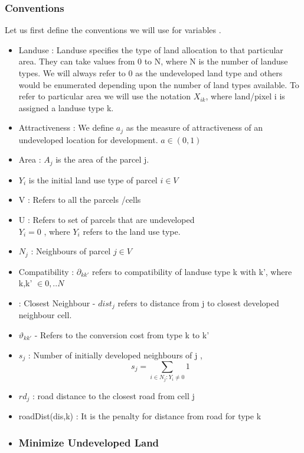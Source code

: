\documentclass[twoside,10pt]{article}
\begin{document}
\subsubsection*{Conventions}
Let us first define the conventions we will use for variables . \\ 
\begin{itemize}
\item Landuse : Landuse specifies the type of land allocation to that particular area. They can take values from 0 to N, where N is the number of landuse types. We will always refer to 0 as the undeveloped land type and others would be enumerated depending upon the number of land types available. To refer to particular area we will use the notation $X_{ik}$, where land/pixel i is assigned a landuse type k.
\item Attractiveness : We define $a_j$  as the measure of attractiveness of an undeveloped location for development. 
$ a \in (0,1)$
\item Area : $A_j$ is the area of the parcel j.
\item $Y_i$ is the initial land use type of parcel $i \in V$
\item V : Refers to all the parcels /cells

\item U : Refers to set of parcels that are undeveloped \\
 
$ Y_{i} = 0$ , where  $Y_{i}$ refers to the land use type. 
\item $N_j$ : Neighbours of parcel $j \in V$    
\item Compatibility : $\partial_{kk'}$ refers to compatibility of landuse type k with k', where k,k' $\in {0,..N}$
\item : Closest Neighbour -  $dist_j$ refers to distance from j to closest developed neighbour cell.
\item $\vartheta_{kk'} $ - Refers to the conversion cost from  type k to k'
\item $s_j$ : Number of initially developed neighbours of j , $$ s_j = \sum_{i \in N_j: Y_i \neq 0} 1$$
\item $rd_j$ : road distance to the closest road from cell  j
\item roadDist(dis,k) : It is the penalty for distance from road for type k


\item
\subsubsection*{Minimize Undeveloped Land}


\end{itemize}
\end{document}
